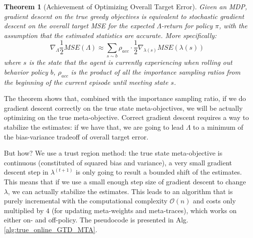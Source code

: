 \documentclass{article}
\newcommand\scriptO{\mathcal{O}}
\newtheorem{theorem}{Theorem}[section]
\begin{document}
\begin{theorem}[Achievement of Optimizing Overall Target Error]\label{thm:nongreedy}
Given an MDP, gradient descent on the true greedy objectives is equivalent to stochastic gradient descent on the overall target MSE for the expected $\Lambda$-return for policy $\pi$, with the assumption that the estimated statistics are accurate. More specifically:
$$\nabla_{\Lambda} \frac{1}{2} MSE(\Lambda) \approx \sum_{s \sim b}{\rho_{acc} \cdot \frac{1}{2} \nabla_{\lambda(s)} MSE(\lambda(s))}$$
where $s$ is the state that the agent is currently experiencing when rolling out behavior policy $b$, $\rho_{acc}$ is the product of all the importance sampling ratios from the beginning of the current episode until meeting state $s$.
\end{theorem}
The theorem shows that, combined with the importance sampling ratio, if we do gradient descent correctly on the true state meta-objectives, we will be actually optimizing on the true meta-objective. Correct gradient descent requires  a way to stabilize the estimates: if we have that, we are going to lead $\Lambda$ to a minimum of the bias-variance tradeoff of overall target error.
\par
But how? We use a trust region method: the true state meta-objective is continuous (constituted of squared bias and variance), a very small gradient descent step in $\lambda^{(t+1)}$ is only going to result a bounded shift of the estimates. This means that if we use a small enough step size of gradient descent to change $\lambda$, we can actually stabilize the estimates. This leads to an algorithm that is purely incremental with the computational complexity $\scriptO(n)$ and costs only multiplied by $4$ (for updating meta-weights and meta-traces), which works on either on- and off-policy. The pseudocode is presented in Alg. \ref{alg:true_online_GTD_MTA}.
\end{document}
